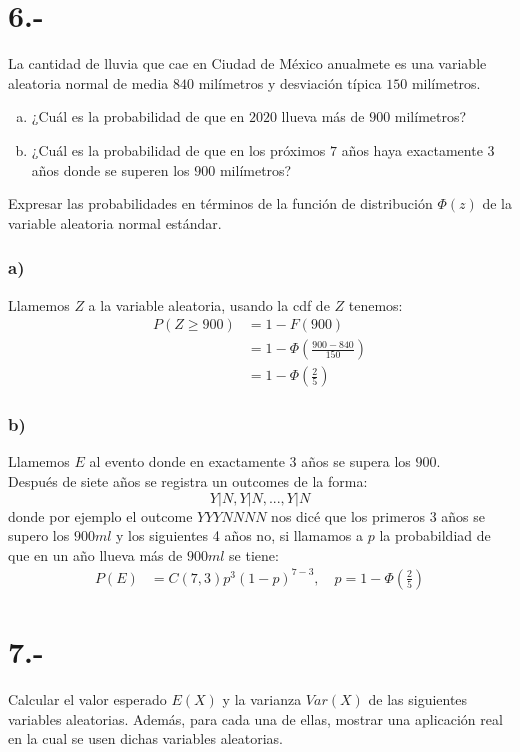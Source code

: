 \documentclass{article}
\begin{document}
\section*{6.-}
La cantidad de lluvia que cae en Ciudad de México anualmete es una variable aleatoria normal de media $840$ milímetros y desviación típica $150$ milímetros.
\begin{enumerate}[a)]
    \item ¿Cuál es la probabilidad de que en $2020$ llueva más de $900$ milímetros?
    \item ¿Cuál es la probabilidad de que en los próximos $7$ años haya exactamente $3$ años 
    donde se superen los $900$ milímetros?
\end{enumerate}
Expresar las probabilidades en términos de la función de distribución $\Phi(z)$ de la variable aleatoria 
normal estándar.
\begin{tcolorbox}[breakable]
    \subsubsection*{a)}
    Llamemos $Z$ a la variable aleatoria, usando la cdf de $Z$ tenemos:
    \begin{align*}
        P(Z \geq 900) 
        &= 1-F(900) \\
        &= 1-\Phi(\tfrac{900-840}{150}) \\
        &= 1-\Phi(\tfrac{2}{5})
    \end{align*} 
    \subsubsection*{b)}
    Llamemos $E$ al evento donde en exactamente 3 años se supera los $900$. \\
    Después de siete años se registra un outcomes de la forma:
    \[ Y|N,Y|N,...,Y|N \]
    donde por ejemplo el outcome $YYYNNNN$ nos dicé que los primeros 3 años se supero 
    los $900ml$ y los siguientes 4 años no, si llamamos a $p$ la probabildiad de que en un año llueva más de $900ml$
    se tiene:
    \begin{align*}
        P(E) &= C(7,3)p^3(1-p)^{7-3}, \quad p = 1-\Phi(\tfrac{2}{5})
    \end{align*}
\end{tcolorbox}

\section*{7.-}
Calcular el valor esperado $E(X)$ y la varianza $Var(X)$ de las siguientes variables aleatorias. Además, para cada una de ellas, mostrar una aplicación  
real en la cual se usen dichas variables aleatorias.
\end{document}
